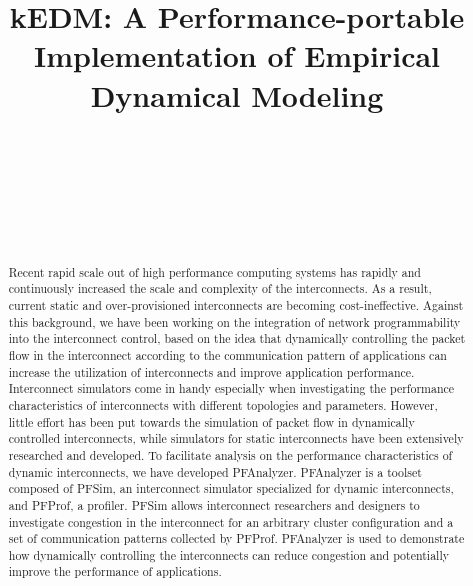 \documentclass[conference]{IEEEtran}
\begin{document}
\title{kEDM: A Performance-portable Implementation of Empirical Dynamical Modeling}

\author{%
     \\
    \and
     \\
    \and
     \\
     \\
}

\maketitle

\begin{abstract}
    Recent rapid scale out of high performance computing systems has
    rapidly and continuously increased the scale and complexity of the
    interconnects. As a result, current static and over-provisioned
    interconnects are becoming cost-ineffective. Against this background, we have
    been working on the integration of network programmability into
    the interconnect control, based on the idea that dynamically controlling
    the packet flow in the interconnect according to the communication pattern
    of applications can increase the utilization of interconnects and improve
    application performance. Interconnect simulators come in handy especially
    when investigating the performance characteristics of interconnects with
    different topologies and parameters. However, little effort has been put
    towards the simulation of packet flow in dynamically controlled interconnects,
    while simulators for static interconnects have been extensively researched
    and developed. To facilitate analysis on the performance
    characteristics of dynamic interconnects, we have developed PFAnalyzer.
    PFAnalyzer is a toolset composed of PFSim, an interconnect simulator
    specialized for dynamic interconnects, and PFProf, a profiler.
    PFSim allows interconnect researchers and designers to investigate
    congestion in the interconnect for an arbitrary cluster configuration and
    a set of communication patterns collected by PFProf. PFAnalyzer is used
    to demonstrate how dynamically controlling the interconnects can reduce
    congestion and potentially improve the performance of applications.
\end{abstract}
\end{document}
